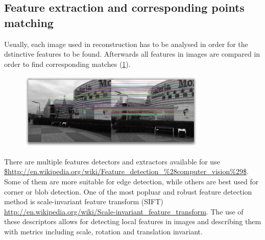 \subsection{Feature extraction and corresponding points matching}
Usually, each image used in reconstruction has to be analysed in order for the dstinctive features to be found. Afterwards all features in images are compared in order to find corresponding matches (\ref{fig:correspondingMatches}).
\begin{figure}[p]
    \centering
    \includegraphics[width=0.8\textwidth]{correspondingMatching}
    \caption{}
    \label{fig:correspondingMatches}
\end{figure}
There are multiple features detectors and extractors available for use \url{$http://en.wikipedia.org/wiki/Feature_detection_%28computer_vision%29$}. Some of them are more suitable for edge detection, while others are best used for corner or blob detection. One of the most popluar and robust feature detection method is scale-invariant feature transform (SIFT) \url{http://en.wikipedia.org/wiki/Scale-invariant_feature_transform}. The use of these descriptors allows for detecting local features in images and describing them with metrics including scale, rotation and translation invariant.
